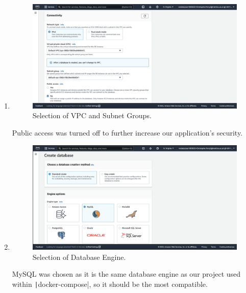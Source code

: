 \begin{enumerate}
    \item
    \begin{figure}[H]
        \centering
        \includegraphics[width=\textwidth]{resources/rds/rds-connectivity-1}
        \caption{Selection of VPC and Subnet Groups.}
        \label{fig:rds-connecting}
    \end{figure}\nolinebreak
    Public access was turned off to further increase our application's security.

    \item
    \begin{figure}[H]
        \centering
        \includegraphics[width=\textwidth]{resources/rds/rds-create-engine}
        \caption{Selection of Database Engine.}
        \label{fig:rds-engine}
    \end{figure}\nolinebreak
    MySQL was chosen as it is the same database engine as our project used within \texttt|docker-compose|, so it should be the most compatible.


\end{enumerate}
